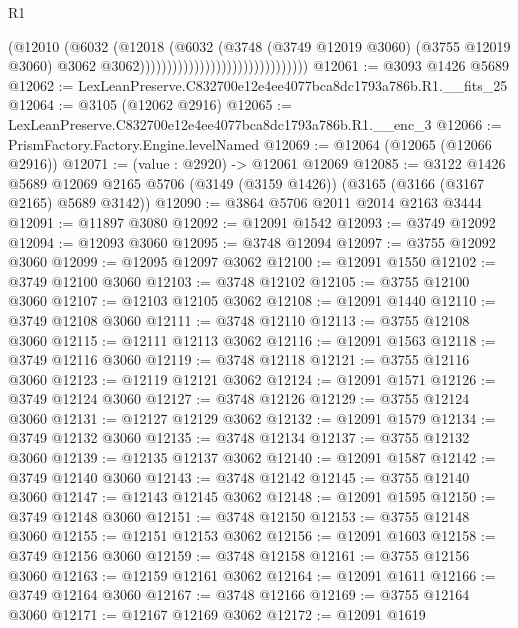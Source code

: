 \begin{lexlean}{R1}
\begin{coremodule}
                                                        (@12010
                                                          (@6032
                                                            (@12018
                                                              (@6032
                                                                (@3748
                                                                  (@3749 @12019 @3060)
                                                                  (@3755 @12019 @3060)
                                                                  @3062
                                                                  @3062)))))))))))))))))))))))))))))))
@12061 := @3093 @1426 @5689
@12062 := LexLeanPreserve.C832700e12e4ee4077bca8dc1793a786b.R1.__fits_25
@12064 := @3105 (@12062 @2916)
@12065 := LexLeanPreserve.C832700e12e4ee4077bca8dc1793a786b.R1.__enc_3
@12066 := PrismFactory.Factory.Engine.levelNamed
@12069 := @12064 (@12065 (@12066 @2916))
@12071 := (value : @2920) -> @12061 @12069
@12085 := @3122
    @1426
    @5689
    @12069
    @2165
    @5706
    (@3149 (@3159 @1426))
    (@3165 (@3166 (@3167 @2165) @5689 @3142))
@12090 := @3864 @5706 @2011 @2014 @2163 @3444
@12091 := @11897 @3080
@12092 := @12091 @1542
@12093 := @3749 @12092
@12094 := @12093 @3060
@12095 := @3748 @12094
@12097 := @3755 @12092 @3060
@12099 := @12095 @12097 @3062
@12100 := @12091 @1550
@12102 := @3749 @12100 @3060
@12103 := @3748 @12102
@12105 := @3755 @12100 @3060
@12107 := @12103 @12105 @3062
@12108 := @12091 @1440
@12110 := @3749 @12108 @3060
@12111 := @3748 @12110
@12113 := @3755 @12108 @3060
@12115 := @12111 @12113 @3062
@12116 := @12091 @1563
@12118 := @3749 @12116 @3060
@12119 := @3748 @12118
@12121 := @3755 @12116 @3060
@12123 := @12119 @12121 @3062
@12124 := @12091 @1571
@12126 := @3749 @12124 @3060
@12127 := @3748 @12126
@12129 := @3755 @12124 @3060
@12131 := @12127 @12129 @3062
@12132 := @12091 @1579
@12134 := @3749 @12132 @3060
@12135 := @3748 @12134
@12137 := @3755 @12132 @3060
@12139 := @12135 @12137 @3062
@12140 := @12091 @1587
@12142 := @3749 @12140 @3060
@12143 := @3748 @12142
@12145 := @3755 @12140 @3060
@12147 := @12143 @12145 @3062
@12148 := @12091 @1595
@12150 := @3749 @12148 @3060
@12151 := @3748 @12150
@12153 := @3755 @12148 @3060
@12155 := @12151 @12153 @3062
@12156 := @12091 @1603
@12158 := @3749 @12156 @3060
@12159 := @3748 @12158
@12161 := @3755 @12156 @3060
@12163 := @12159 @12161 @3062
@12164 := @12091 @1611
@12166 := @3749 @12164 @3060
@12167 := @3748 @12166
@12169 := @3755 @12164 @3060
@12171 := @12167 @12169 @3062
@12172 := @12091 @1619

\end{coremodule}
\end{lexlean}
